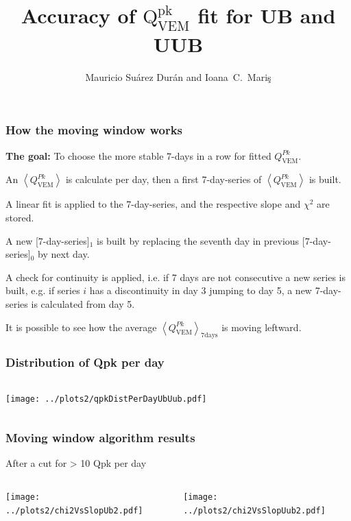 \documentclass[aspectratio=169]{beamer}
\title{Accuracy of $\mathrm{Q}^{\mathrm{pk}}_{\mathrm{VEM}}$ fit for UB and UUB}
\author{
  Mauricio Su\'arez Dur\'an and Ioana~C.~Mari\c{s}
}
\institute{IIHE-ULB}
\begin{document}
\begin{frame}
  \titlepage
\end{frame}


\begin{frame}
  \frametitle{How the moving window works}
  {\bf The goal:} To choose the more stable 7-days in a row for
  fitted $Q^{Pk}_{\mathrm{VEM}}$.
  \vspace{0.2cm}
  \begin{enumerate}
      {\footnotesize
    \item An $\left<Q^{Pk}_{\mathrm{VEM}}\right>$ is calculate
      per day, then a first 7-day-series of
      $\left<Q^{Pk}_{\mathrm{VEM}}\right>$ is built.
    \item A linear fit is applied to the 7-day-series, and
      the respective slope and $\chi^2$ are stored.
    \item A new [7-day-series]$_1$ is built by replacing the
      seventh day in previous [7-day-series]$_0$ by next day.
    \item A check for continuity is applied, i.e. if 7 days are
      not consecutive a new series is built, e.g. if series
      $i$ has a discontinuity in day 3 jumping to day 5, a new
      7-day-series is calculated from day 5.
      }
  \end{enumerate}
  \begin{center}
  \end{center}
  {\scriptsize It is possible to see how the average
  $\left<Q^{Pk}_{\mathrm{VEM}}\right>_{7\mathrm{days}}$ is moving
  leftward.}
\end{frame}

\begin{frame}
  \frametitle{Distribution of Qpk per day}
  \vspace{0.5cm}
  \begin{columns}
    \begin{column}{1.\textwidth}
      \texttt{[image: ../plots2/qpkDistPerDayUbUub.pdf]}
    \end{column} 
  \end{columns}
\end{frame}

\begin{frame}
  \frametitle{Moving window algorithm results}
  After a cut for > 10 Qpk per day
  \vspace{0.5cm}
  \begin{columns}
    \begin{column}{0.5\textwidth}
      \texttt{[image: ../plots2/chi2VsSlopUb2.pdf]}
    \end{column}
    \begin{column}{0.5\textwidth}
      \texttt{[image: ../plots2/chi2VsSlopUub2.pdf]}
    \end{column}
  \end{columns}
\end{frame}
\end{document}
